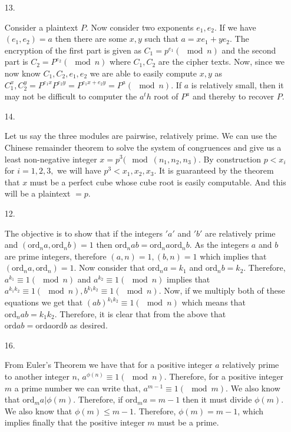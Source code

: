 \documentclass{article}
\theoremstyle{definition}
\begin{document}
\begin{enumerate}
    \item [13. ]
    
    Consider a plaintext $P.$ Now consider two exponents $e_1, e_2.$ If we have $(e_1, e_2) = a$ then there are some $x, y$ such that $a = xe_1 + ye_2.$ The encryption of the first part is given as $C_1 = p^{e_1} (\mod n)$ and the second part is $C_2 = P^{e_2}(\mod n)$ where $C_1, C_2$ are the cipher texts. Now, since we now know $C_1, C_2, e_1, e_2$ we are able to easily compute $x, y$ as $C_1^x, C_2^y = P^{e_1x}P^{e_2y} = P^{e_1x+e_2y} = P^a (\mod n)$. If $a$ is relatively small, then it may not be difficult to computer the $a^th$ root of $P^a$ and thereby to recover $P.$
    
    \item [14. ]
    
    Let us say the three modules are pairwise, relatively prime. We can use the Chinese remainder theorem to solve the system of congruences and give us a least non-negative integer $x = p^3 (\mod(n_1, n_2, n_3).$ By construction $p <x_i$ for $i = 1, 2, 3,$ we will have $p^3 < x_1, x_2, x_3.$ It is guaranteed by the theorem that $x$ must be a perfect cube whose cube root is easily computable. And this will be a plaintext $= p$.
    
    \item [12. ]
    
    The objective is to show that if the integers $'a'$ and $'b'$ are relatively prime and $(\text{ord}_n a, \text{ord}_n b) = 1$ then $\text{ord}_n ab = \text{ord}_na\text{ord}_nb.$ As the integers $a$ and $b$ are prime integers, therefore $(a, n) = 1, (b, n) = 1$ which implies that $(\text{ord}_na, \text{ord}_n) = 1$. Now consider that $\text{ord}_na = k_1$ and $\text{ord}_nb = k_2$. Therefore, $a^{k_1}\equiv 1 (\mod n)$ and $a^{k_2}\equiv 1 (\mod n)$ implies that $a^{k_1k_2}\equiv 1 (\mod n), b^{k_1k_2}\equiv 1(\mod n)$. Now, if we multiply both of these equations we get that $(ab)^{k_1k_2} \equiv 1 (\mod n)$ which means that $\text{ord}_nab = k_1k_2.$ Therefore, it is clear that from the above that $\text{ord}ab = \text{ord}a\text{ord}b$ as desired. 
    
    \item [16. ]
    
    From Euler's Theorem we have that for a positive integer $a$ relatively prime to another integer $n$, $a^{\phi(n)}\equiv 1 (\mod n)$. Therefore, for a positive integer $m$ a prime number we can write that, $a^{m-1}\equiv 1(\mod m).$ We also know that $\text{ord}_ma|\phi(m).$ Therefore, if $\text{ord}_m a = m-1$ then it must divide $\phi(m).$ We also know that $\phi(m) \leq m - 1$. Therefore, $\phi(m) = m-1$, which implies finally that the positive integer $m$ must be a prime.
    

\end{enumerate}
\end{document}
